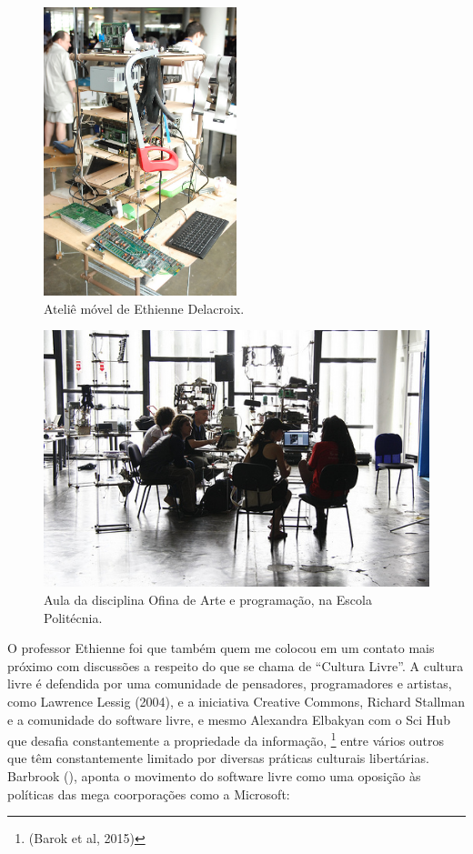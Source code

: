 \begin{figure}

\includegraphics[width=0.5\textwidth]{pictures/cap1/eti1}
\caption{Ateliê móvel de Ethienne Delacroix.}
\label{fig:eti}
\end{figure}

\begin{figure}

\includegraphics[width=1\textwidth]{pictures/cap1/eti2}
\caption{Aula da disciplina Ofina de Arte e programação, na Escola Politécnia.}
\label{fig:eti2}
\end{figure}

O professor Ethienne foi que também quem me colocou em um contato mais próximo com discussões a respeito do que se chama de ``Cultura Livre''. A cultura livre é defendida por uma comunidade de pensadores, programadores e artistas, como Lawrence Lessig (2004), e a iniciativa Creative Commons, Richard Stallman e a comunidade do software livre, e mesmo Alexandra Elbakyan com o Sci Hub que desafia constantemente a propriedade da informação, \footnote{(Barok et al, 2015)} entre vários outros que têm constantemente limitado por diversas práticas culturais libertárias. Barbrook (\citeyear{Barbrook2009}), aponta o movimento do software livre como uma oposição às políticas das mega coorporações como a Microsoft:

